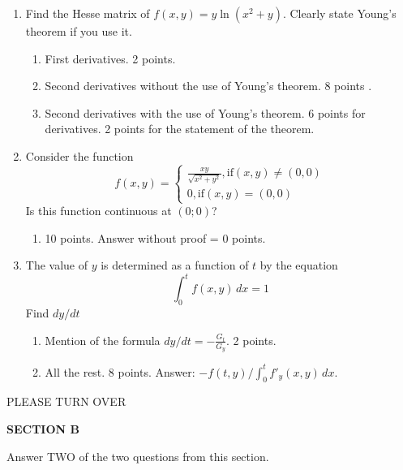 \begin{enumerate}
\item Find the Hesse matrix of $f(x,y)=y\ln(x^2+y)$. Clearly state Young's theorem if you use it.

\begin{enumerate}
\item First derivatives. 2 points.
\item Second derivatives without the use of Young's theorem. 8 points .
\item Second derivatives with the use of Young's theorem. 6 points for derivatives. 2 points for the statement of the theorem.
\end{enumerate}



\item Consider the function
\begin{equation}
f(x,y)=
\begin{cases}
	\frac{xy}{\sqrt{x^2+y^2}}, \mbox{if} (x,y)\neq (0,0) \\
	0, \mbox{if} (x,y)=(0,0)
\end{cases}
\end{equation}
Is this function continuous at $(0;0)$?

\begin{enumerate}
\item 10 points. Answer without proof = 0 points.
\end{enumerate}


\item The value of $y$ is determined as a function of $t$ by the equation
\begin{equation}
\int_{0}^{t}f(x,y)\, dx=1
\end{equation}
Find $dy/dt$

\begin{enumerate}
\item Mention of the formula $dy/dt=-\frac{G_t}{G_y}$. 2 points.
\item All the rest. 8 points. Answer: $-f(t,y)/\int_0^tf'_y(x,y)\, dx$.
\end{enumerate}


\end{enumerate}

PLEASE TURN OVER

\textbf{SECTION B}

Answer TWO of the two questions from this section.


